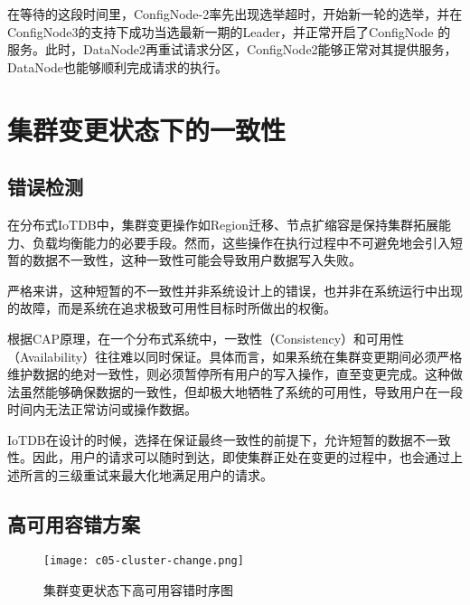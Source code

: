 在等待的这段时间里，ConfigNode-2率先出现选举超时，开始新一轮的选举，并在ConfigNode3的支持下成功当选最新一期的Leader，并正常开启了ConfigNode 的服务。此时，DataNode2再重试请求分区，ConfigNode2能够正常对其提供服务，DataNode也能够顺利完成请求的执行。

\section{集群变更状态下的一致性}

\subsection{错误检测}

在分布式IoTDB中，集群变更操作如Region迁移、节点扩缩容是保持集群拓展能力、负载均衡能力的必要手段。然而，这些操作在执行过程中不可避免地会引入短暂的数据不一致性，这种一致性可能会导致用户数据写入失败。

严格来讲，这种短暂的不一致性并非系统设计上的错误，也并非在系统运行中出现的故障，而是系统在追求极致可用性目标时所做出的权衡。

根据CAP原理\cite{fox1999harvest}，在一个分布式系统中，一致性（Consistency）和可用性（Availability）往往难以同时保证。具体而言，如果系统在集群变更期间必须严格维护数据的绝对一致性，则必须暂停所有用户的写入操作，直至变更完成。这种做法虽然能够确保数据的一致性，但却极大地牺牲了系统的可用性，导致用户在一段时间内无法正常访问或操作数据。

IoTDB在设计的时候，选择在保证最终一致性的前提下，允许短暂的数据不一致性。因此，用户的请求可以随时到达，即使集群正处在变更的过程中，也会通过上述所言的三级重试来最大化地满足用户的请求。

\subsection{高可用容错方案}

\begin{figure}
    \centering
    \texttt{[image: c05-cluster-change.png]}
    \caption{集群变更状态下高可用容错时序图}
    \label{fig:c05-cluster-change}
\end{figure}